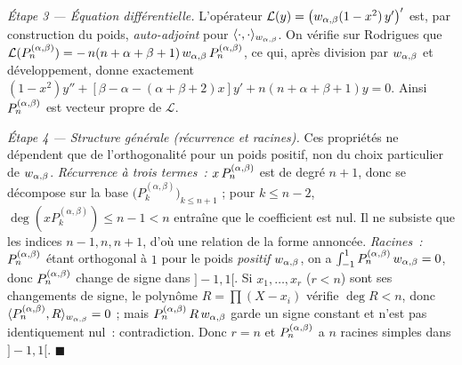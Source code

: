 \begin{mdframed}[style=proofbar]
  \medskip
  \textit{Étape 3 — Équation différentielle.}
  L'opérateur $\mathcal{L}(y)=\bigl(w_{\alpha,\beta}(1-x^2)\,y'\bigr)'$ est, par
  construction du poids, \emph{auto-adjoint} pour $\langle\cdot,\cdot
  \rangle_{w_{\alpha,\beta}}$. On vérifie sur Rodrigues que $\mathcal{L}(P_n^{(\alpha,\beta)})
  =-\,n(n+\alpha+\beta+1)\,w_{\alpha,\beta}\,P_n^{(\alpha,\beta)}$, ce qui, après division par $w_{\alpha,\beta}$
  et développement, donne exactement
  $(1-x^2)y''+[\beta-\alpha-(\alpha+\beta+2)x]y'+n(n+\alpha+\beta+1)y=0$.
  Ainsi $P_n^{(\alpha,\beta)}$ est vecteur propre de $\mathcal{L}$.

  \medskip
  \textit{Étape 4 — Structure générale (récurrence et racines).}
  Ces propriétés ne dépendent que de l'orthogonalité pour un poids positif,
  non du choix particulier de $w_{\alpha,\beta}$.
  \emph{Récurrence à trois termes~:} $x\,P_n^{(\alpha,\beta)}$ est de degré $n+1$, donc se
  décompose sur la base $\bigl(P_k^{(\alpha,\beta)}\bigr)_{k\leq n+1}$ ; pour
  $k\leq n-2$, $\deg(xP_k^{(\alpha,\beta)})\leq n-1<n$ entraîne que le
  coefficient est nul. Il ne subsiste que les indices $n-1,n,n+1$, d'où une
  relation de la forme annoncée.
  \emph{Racines~:} $P_n^{(\alpha,\beta)}$ étant orthogonal à $1$ pour le poids \emph{positif}
  $w_{\alpha,\beta}$, on a $\int_{-1}^1P_n^{(\alpha,\beta)}\,w_{\alpha,\beta}=0$, donc $P_n^{(\alpha,\beta)}$ change de signe dans
  $]-1,1[$. Si $x_1,\dots,x_r$ ($r<n$) sont ses changements de signe, le
  polynôme $R=\prod(X-x_i)$ vérifie $\deg R<n$, donc
  $\langle P_n^{(\alpha,\beta)},R\rangle_{w_{\alpha,\beta}}=0$ ; mais $P_n^{(\alpha,\beta)}\,R\,w_{\alpha,\beta}$ garde un signe
  constant et n'est pas identiquement nul~: contradiction. Donc $r=n$ et
  $P_n^{(\alpha,\beta)}$ a $n$ racines simples dans $]-1,1[$.
  \hfill$\blacksquare$
\end{mdframed}

\decsep{}




